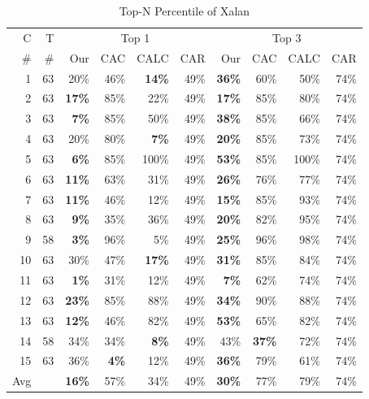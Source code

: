 \begin{table}
\centering 
\caption{Top-N Percentile of Xalan}
	
\label{tab:xalan}
\scriptsize
\begin{tabular}{r|r||r|r|r|r||r|r|r|r}
\hline
C &T & \multicolumn{4}{c||}{Top 1} & \multicolumn{4}{c}{Top 3} 
\\  \cline{3-10}
\#  & \#   & Our & CAC  & CALC & CAR&  Our  & CAC  & CALC & CAR\\\hline
1 & 63     & 20\%& 46\% & \textbf{14\%} & 49\% & \textbf{36\%} & 60\% & 50\% & 74\% \\
2 & 63   & \textbf{17\%} & 85\% & 22\% & 49\%& \textbf{17\%} & 85\%& 80\%&74\% \\
3 & 63      & \textbf{7\%} & 85\% & 50\% & 49\%  & \textbf{38\%} & 85\% & 66\% & 74\% \\
4 & 63   &  20\%& 80\% & \textbf{7\%} & 49\% & \textbf{20\%} & 85\% & 73\% & 74\% \\
5 & 63   & \textbf{6\%} & 85\% &  100\% & 49\% & \textbf{53\%}  & 85\% & 100\% & 74\%\\
6 & 63      & \textbf{11\%} & 63\% & 31\% & 49\% & \textbf{26\%} & 76\% & 77\% & 74\% \\
7 & 63   & \textbf{11\%} & 46\% &  12\% & 49\% & \textbf{15\%} & 85\% & 93\% & 74\% \\
8 & 63    & \textbf{9\%}  & 35\% & 36\% & 49\% & \textbf{20\%} & 82\% & 95\% & 74\% \\
9 & 58      & \textbf{3\%} & 96\% &  5\% & 49\% & \textbf{25\%} & 96\% & 98\% & 74\% \\
10 & 63   & 30\% & 47\% & \textbf{17\%} & 49\% & \textbf{31\%} & 85\% & 84\% & 74\% \\
11 & 63   & \textbf{1\%} & 31\% & 12\% & 49\% &  \textbf{7\%}  & 62\% & 74\% & 74\% \\
12 & 63     & \textbf{23\%} & 85\% & 88\% & 49\% & \textbf{34\%} & 90\% & 88\% & 74\%\\
13 & 63     & \textbf{12\%} & 46\%& 82\% & 49\%  & \textbf{53\%}  & 65\%& 82\% &74\% \\
14 & 58    & 34\% & 34\% & \textbf{8\%} & 49\% & 43\% & \textbf{37\%}  & 72\% & 74\% \\ 
15 & 63     & 36\% & \textbf{4\%} & 12\% & 49\% & \textbf{36\%} & 79\%& 61\% & 74\% \\ \hline
Avg        & & \textbf{16\%} & 57\%  & 34\% & 49\%& \textbf{30\%} & 77\%  & 79\% & 74\% \\		\hline
\end{tabular}
\end{table}

